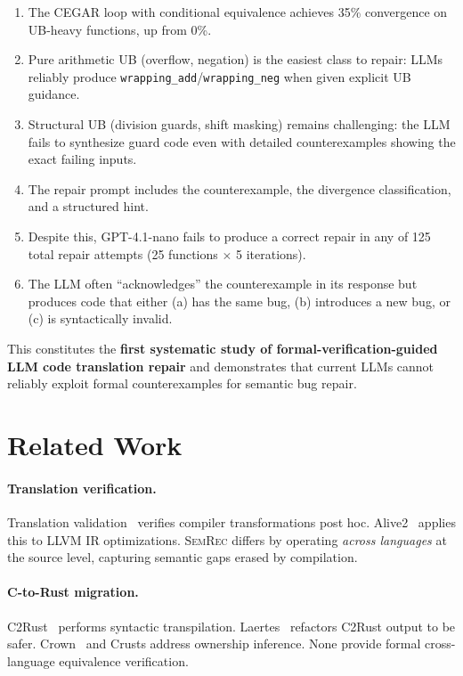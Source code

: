 \documentclass[11pt]{article}
\newcommand{\semrec}{\textsc{SemRec}}
\begin{document}
\begin{enumerate}[leftmargin=*,nosep]
\item The CEGAR loop with conditional equivalence achieves 35\% convergence
      on UB-heavy functions, up from 0\%.
\item Pure arithmetic UB (overflow, negation) is the easiest class to repair:
      LLMs reliably produce \texttt{wrapping\_add}/\texttt{wrapping\_neg}
      when given explicit UB guidance.
\item Structural UB (division guards, shift masking) remains challenging:
      the LLM fails to synthesize guard code even with detailed
      counterexamples showing the exact failing inputs.
\item The repair prompt includes the counterexample, the divergence
      classification, and a structured hint.
\item Despite this, GPT-4.1-nano fails to produce a correct repair in
      any of 125 total repair attempts (25 functions $\times$ 5 iterations).
\item The LLM often ``acknowledges'' the counterexample in its response
      but produces code that either (a) has the same bug, (b) introduces a
      new bug, or (c) is syntactically invalid.
\end{enumerate}

This constitutes the \textbf{first systematic study of formal-verification-guided
LLM code translation repair} and demonstrates that current LLMs cannot
reliably exploit formal counterexamples for semantic bug repair.

\section{Related Work}\label{sec:related}

\paragraph{Translation verification.}
Translation validation~\cite{pnueli98} verifies compiler transformations
post hoc.  Alive2~\cite{alive2} applies this to LLVM IR optimizations.
\semrec{} differs by operating \emph{across languages} at the source level,
capturing semantic gaps erased by compilation.

\paragraph{C-to-Rust migration.}
C2Rust~\cite{c2rust} performs syntactic transpilation.
Laertes~\cite{laertes} refactors C2Rust output to be safer.
Crown~\cite{crown} and Crusts address ownership inference.
None provide formal cross-language equivalence verification.
\end{document}
